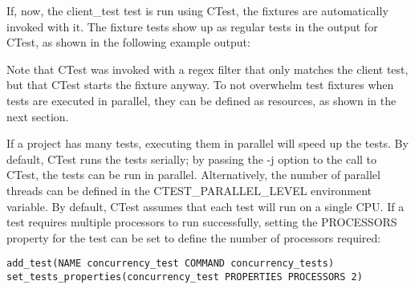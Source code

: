 If, now, the client\_test test is run using CTest, the fixtures are automatically invoked with it. The fixture tests show up as regular tests in the output for CTest, as shown in the following example output:


Note that CTest was invoked with a regex filter that only matches the client test, but that CTest starts the fixture anyway. To not overwhelm test fixtures when tests are executed in parallel, they can be defined as resources, as shown in the next section.


If a project has many tests, executing them in parallel will speed up the tests. By default, CTest runs the tests serially; by passing the -j option to the call to CTest, the tests can be run in parallel. Alternatively, the number of parallel threads can be defined in the CTEST\_PARALLEL\_LEVEL environment variable. By default, CTest assumes that each test will run on a single CPU. If a test requires multiple processors to run successfully, setting the PROCESSORS property for the test can be set to define the number of processors required:

\begin{lstlisting}[style=styleCMake]
add_test(NAME concurrency_test COMMAND concurrency_tests)
set_tests_properties(concurrency_test PROPERTIES PROCESSORS 2)
\end{lstlisting}

